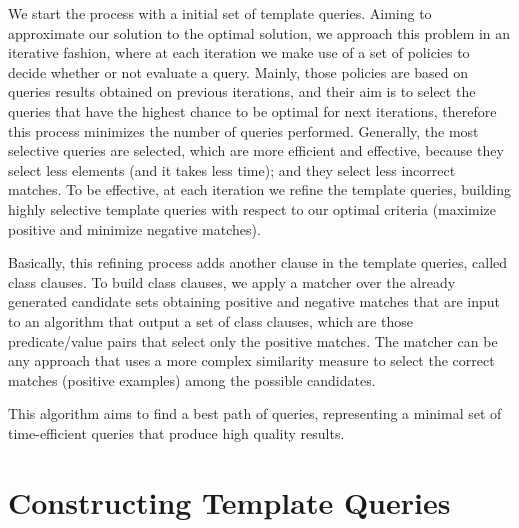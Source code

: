 \begin{itemize}
We start the process with a initial set of template queries. Aiming to approximate our solution to the optimal solution, we approach this problem in an iterative fashion, where at each iteration we make use of a set of policies to decide whether or not evaluate a query. Mainly, those policies are based on queries results obtained on previous iterations, and their aim is to select the queries that have the highest chance to be optimal for next iterations, therefore this process minimizes the number of queries performed. Generally, the most selective queries are selected, which are more efficient and effective, because they select less elements (and it takes less time); and they select less incorrect matches. To be effective, at each iteration we refine the template queries, building highly selective template queries with respect to our optimal criteria (maximize positive and minimize negative matches). 

Basically, this refining process adds another clause in the template queries, called class clauses. To build class clauses, we apply a matcher over the already generated candidate sets obtaining positive and negative matches that are input to an algorithm that output a set of class clauses, which are those predicate/value pairs that select only the positive matches.  The matcher can be any approach that uses a more complex similarity measure to select the correct matches (positive examples) among the possible candidates. 

This algorithm aims to find a best path of queries, representing a minimal set of time-efficient queries that produce high quality results.


\end{itemize}


\section{Constructing Template Queries}

